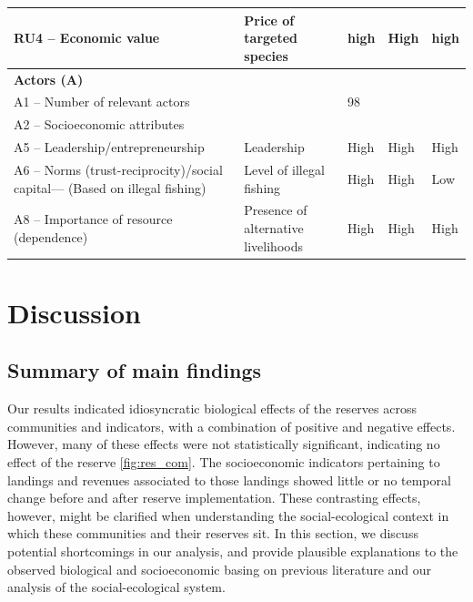 \documentclass{frontiersSCNS}
\theoremstyle{definition}
\theoremstyle{definition}
\theoremstyle{definition}
\theoremstyle{remark}
\begin{document}
\begin{table}
\begin{tabular}[t]{>{\raggedright\arraybackslash}p{10em}|>{\raggedright\arraybackslash}p{10em}|l|l|l}
\hline
RU4 – Economic value & Price of targeted species & high & High & high\\
\hline
\textbf{Actors (A)} & \textbf{} & \textbf{} & \textbf{}\\
\hline
A1 – Number of relevant actors &  & 98 &  & \\
\hline
A2 – Socioeconomic attributes &  &  &  & \\
\hline
A5 – Leadership/entrepreneurship & Leadership & High & High & High\\
\hline
A6 – Norms (trust-reciprocity)/social capital--- (Based on illegal fishing) & Level of illegal fishing & High & High & Low\\
\hline
A8 – Importance of resource (dependence) & Presence of alternative livelihoods & High & High & High\\
\hline
\end{tabular}
\end{table}

\clearpage

\section{Discussion}\label{discussion}

\subsection{Summary of main findings}\label{summary-of-main-findings}

Our results indicated idiosyncratic biological effects of the reserves
across communities and indicators, with a combination of positive and
negative effects. However, many of these effects were not statistically
significant, indicating no effect of the reserve \ref{fig:res_com}. The
socioeconomic indicators pertaining to landings and revenues associated
to those landings showed little or no temporal change before and after
reserve implementation. These contrasting effects, however, might be
clarified when understanding the social-ecological context in which
these communities and their reserves sit. In this section, we discuss
potential shortcomings in our analysis, and provide plausible
explanations to the observed biological and socioeconomic basing on
previous literature and our analysis of the social-ecological system.
\end{document}
